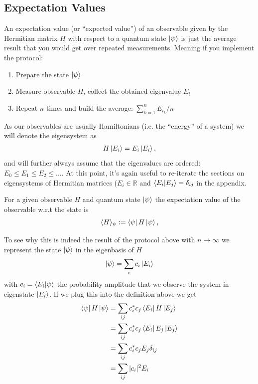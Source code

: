 \subsection{Expectation Values}
An expectation value (or ``expected value'') of an observable given by the Hermitian matrix $H$ with respect to a quantum state $\ket{\psi}$ is just the average result that you would get over repeated measurements. Meaning if you implement the protocol:
\begin{enumerate}
    \item Prepare the state $\ket{\psi}$
    \item Measure observable $H$, collect the obtained eigenvalue $E_i$
    \item Repeat $n$ times and build the average: $\sum_{k=1}^n E_{i_k}/n$ 
\end{enumerate}
As our observables are usually Hamiltonians (i.e. the ``energy'' of a system) we will denote the eigensystem as
\begin{align}
    H\ket{E_i} = E_i \ket{E_i},
\end{align}
and will further always assume that the eigenvalues are ordered: $E_0 \leq E_1 \leq E_2\leq \dots $.
At this point, it's again useful to re-iterate the sections on eigensystems of Hermitian matrices ($E_i\in \mathbb{R}$ and $\braket{E_i}{E_j}=\delta_{ij}$ in the appendix.
\begin{def*} For a given observable $H$ and quantum state $\ket{\psi}$ the expectation value of the observable w.r.t the state is
\begin{align} 
    \langle H \rangle_\psi := \bra{\psi}H\ket{\psi},
\end{align}
\end{def*}
To see why this is indeed the result of the protocol above with $n\rightarrow \infty$ we represent the state $\ket{\psi}$ in the eigenbasis of $H$
\begin{align}
    \ket{\psi} = \sum_{i} c_i \ket{E_i}
\end{align}
with $c_i=\braket{E_i}{\psi}$ the probability amplitude that we observe the system in eigenstate $\ket{E_i}$. If we plug this into the definition above we get
\begin{align} 
     \bra{\psi}H\ket{\psi} &= \sum_{ij} c_i^* c_j \bra{E_i}H\ket{E_j}\nonumber\\
     &= \sum_{ij} c_i^* c_j \bra{E_i}E_j\ket{E_j}\nonumber\\
      &= \sum_{ij} c_i^* c_j E_j \delta_{ij}\nonumber\\
       &= \sum_{ij} |c_i|^2 E_i\nonumber\\
\end{align}
